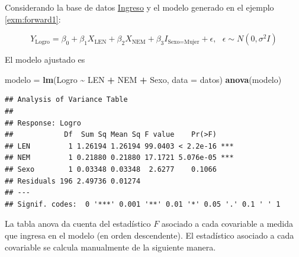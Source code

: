 \documentclass[
  11pt,
]{book}
\newenvironment{Shaded}{\begin{snugshade}}{\end{snugshade}}
\newcommand{\AttributeTok}[1]{\textcolor[rgb]{0.13,0.29,0.53}{#1}}
\newcommand{\FunctionTok}[1]{\textcolor[rgb]{0.13,0.29,0.53}{\textbf{#1}}}
\newcommand{\NormalTok}[1]{#1}
\newcommand{\OtherTok}[1]{\textcolor[rgb]{0.56,0.35,0.01}{#1}}
\newcommand{\SpecialCharTok}[1]{\textcolor[rgb]{0.81,0.36,0.00}{\textbf{#1}}}
\theoremstyle{definition}
\theoremstyle{definition}
\theoremstyle{definition}
\theoremstyle{definition}
\theoremstyle{remark}
\begin{document}
Considerando la base de datos \hyperref[Ingreso]{Ingreso} y el modelo generado en el ejemplo \ref{exm:forward1}:

\[
Y_{\text{Logro}} = \beta_0 + \beta_1X_{\text{LEN}} + \beta_2X_{\text{NEM}} + \beta_3I_{\text{Sexo=Mujer}} + \epsilon, \text{ } \epsilon \sim N(0,\sigma^2I)
\]

El modelo ajustado es

\begin{Shaded}
\begin{Highlighting}[]
\NormalTok{modelo }\OtherTok{=} \FunctionTok{lm}\NormalTok{(Logro }\SpecialCharTok{\textasciitilde{}}\NormalTok{ LEN }\SpecialCharTok{+}\NormalTok{ NEM }\SpecialCharTok{+}\NormalTok{ Sexo, }\AttributeTok{data =}\NormalTok{ datos)}
\FunctionTok{anova}\NormalTok{(modelo)}
\end{Highlighting}
\end{Shaded}

\begin{verbatim}
## Analysis of Variance Table
## 
## Response: Logro
##            Df  Sum Sq Mean Sq F value    Pr(>F)    
## LEN         1 1.26194 1.26194 99.0403 < 2.2e-16 ***
## NEM         1 0.21880 0.21880 17.1721 5.076e-05 ***
## Sexo        1 0.03348 0.03348  2.6277    0.1066    
## Residuals 196 2.49736 0.01274                      
## ---
## Signif. codes:  0 '***' 0.001 '**' 0.01 '*' 0.05 '.' 0.1 ' ' 1
\end{verbatim}

La tabla anova da cuenta del estadístico \(F\) asociado a cada covariable a medida que ingresa en el modelo (en orden descendente). El estadístico asociado a cada covariable se calcula manualmente de la siguiente manera.
\end{document}
